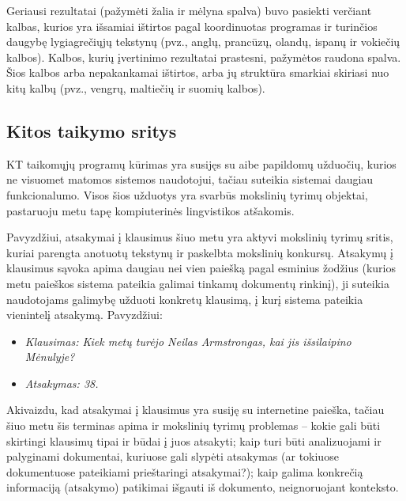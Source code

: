 \begin{multicols}{2}
  Geriausi rezultatai (pažymėti žalia ir mėlyna spalva) buvo pasiekti verčiant kalbas, kurios yra išsamiai ištirtos pagal koordinuotas programas ir turinčios daugybę lygiagrečiųjų tekstynų (pvz., anglų, prancūzų, olandų, ispanų ir vokiečių kalbos). Kalbos, kurių įvertinimo rezultatai prastesni, pažymėtos raudona spalva. Šios kalbos arba nepakankamai ištirtos, arba jų struktūra smarkiai skiriasi nuo kitų kalbų (pvz., vengrų, maltiečių ir suomių kalbos).


\subsection{Kitos taikymo sritys }

 KT taikomųjų programų kūrimas yra susijęs su aibe papildomų užduočių, kurios ne visuomet matomos sistemos naudotojui, tačiau suteikia sistemai daugiau funkcionalumo. Visos šios užduotys yra svarbūs mokslinių tyrimų objektai, pastaruoju metu tapę kompiuterinės lingvistikos atšakomis. 


Pavyzdžiui, atsakymai į klausimus šiuo metu yra aktyvi mokslinių tyrimų sritis, kuriai parengta anotuotų tekstynų ir paskelbta mokslinių konkursų. Atsakymų į klausimus sąvoka apima daugiau nei vien paiešką pagal esminius žodžius (kurios metu paieškos sistema pateikia galimai tinkamų dokumentų rinkinį), ji suteikia naudotojams galimybę užduoti konkretų klausimą, į kurį sistema pateikia vienintelį atsakymą. Pavyzdžiui:

\begin{itemize}
\item[] \textit{Klausimas: Kiek metų turėjo Neilas Armstrongas, kai jis išsilaipino Mėnulyje?}
\item[] \textit{Atsakymas: 38.}
\end{itemize}

Akivaizdu, kad atsakymai į klausimus yra susiję su internetine paieška, tačiau šiuo metu šis terminas apima ir mokslinių tyrimų problemas – kokie gali būti skirtingi klausimų tipai ir būdai į juos atsakyti; kaip turi būti analizuojami ir palyginami dokumentai, kuriuose gali slypėti atsakymas (ar tokiuose dokumentuose pateikiami prieštaringi atsakymai?); kaip galima konkrečią informaciją (atsakymo) patikimai išgauti iš dokumento, neignoruojant konteksto.    




\end{multicols}
